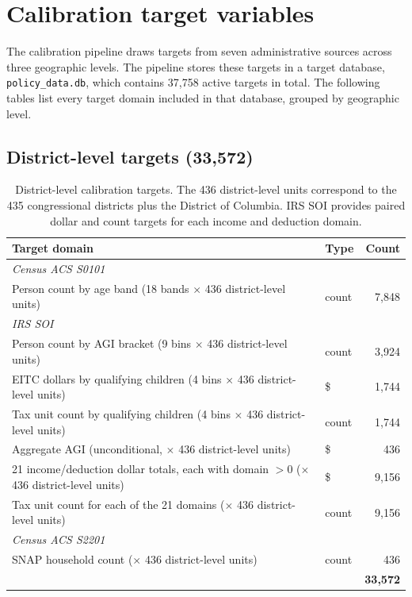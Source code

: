 \section{Calibration target variables}
\label{app:targets}

The calibration pipeline draws targets from seven administrative sources across three geographic
levels. The pipeline stores these targets in a target database, \texttt{policy\_data.db}, which
contains 37,758 active targets in total. The following tables list every target domain included in
that database, grouped by geographic level.

\subsection{District-level targets (33,572)}

\begin{table}[H]
\centering
{\tablefont
\begin{tabular}{p{}lr}
\toprule
Target domain & Type & Count \\
\midrule
\multicolumn{3}{l}{\textit{Census ACS S0101}} \\
Person count by age band (18 bands $\times$ 436 district-level units) & count & 7{,}848 \\
\midrule
\multicolumn{3}{l}{\textit{IRS SOI}} \\
Person count by AGI bracket (9 bins $\times$ 436 district-level units) & count & 3{,}924 \\
EITC dollars by qualifying children (4 bins $\times$ 436 district-level units) & \$ & 1{,}744 \\
Tax unit count by qualifying children (4 bins $\times$ 436 district-level units) & count & 1{,}744 \\
Aggregate AGI (unconditional, $\times$ 436 district-level units) & \$ & 436 \\
21 income/deduction dollar totals, each with domain $> 0$ ($\times$ 436 district-level units) & \$ & 9{,}156 \\
Tax unit count for each of the 21 domains ($\times$ 436 district-level units) & count & 9{,}156 \\
\midrule
\multicolumn{3}{l}{\textit{Census ACS S2201}} \\
SNAP household count ($\times$ 436 district-level units) & count & 436 \\
\midrule
& & \textbf{33{,}572} \\
\bottomrule
\end{tabular}
}
\caption{District-level calibration targets. The 436 district-level units correspond to the 435
congressional districts plus the District of Columbia. IRS SOI provides paired dollar and count
targets for each income and deduction domain.}
\label{tab:cd_targets}
\end{table}

